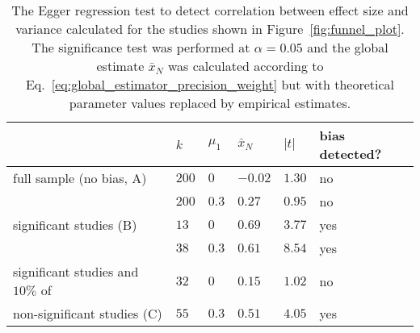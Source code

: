 \begin{table}[h!]
  \begin{center}
    \begin{tabular}{ >{\raggedright\let\\\tabularnewline}p{} | >{\raggedleft\let\\\tabularnewline}p{}| >{\raggedleft\let\\\tabularnewline}p{} | >{\raggedleft\let\\\tabularnewline}p{} | >{\raggedleft\let\\\tabularnewline}p{} | >{\raggedright\let\\\tabularnewline}p{}} 
        \hline
         & $k$\TBstrut & $\mu_1$ & $\bar{x}_N$ & $|t|$ & bias detected?\\ 
        \hline
        full sample (no bias, A)\Tstrut & $200$ & $0$ & $-0.02$  & $1.30$ & no \\ 
        & $200$\Bstrut & $0.3$ & $0.27$  & $0.95$ & no\\
        \hline
        significant studies (B)\Tstrut& $13$ & $0$ & $0.69$ & $3.77$ & yes \\
        & $38$\Bstrut & $0.3$ & $0.61$ & $8.54$ & yes \\
        \hline
        significant studies and $10\%$ of\Tstrut & $32$ & $0$ & $0.15$ & $1.02$ & no \\
        non-significant studies (C) & $55$\Bstrut & $0.3$ & $0.51$ & $4.05$ & yes\\
     \hline
    \end{tabular}
    \caption[Egger regression test to detect publication bias.]{The Egger regression test to detect correlation between effect size and variance calculated for the studies shown in Figure~\ref{fig:funnel_plot}. The significance test was performed at $\alpha = 0.05$ and the global estimate $\bar{x}_N$ was calculated according to Eq.~\ref{eq:global_estimator_precision_weight} but with theoretical parameter values replaced by empirical estimates.}
    \label{tab:Egger_regression}
  \end{center}
\end{table}

